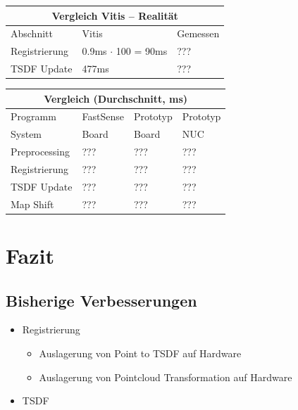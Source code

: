 \documentclass{beamer}
\begin{document}
\begin{frame}{\subsecname}
\centering
\begin{tabular}{ |l||l|l|  }
 \hline
 \multicolumn{3}{|c|}{Vergleich Vitis -- Realität} \\
 \hline
 Abschnitt      & Vitis & Gemessen\\
 \hline
 Registrierung  & 0.9ms $\cdot$ 100 = 90ms & ??? \\
 TSDF Update    & 477ms & ??? \\
 \hline
\end{tabular}
\end{frame}

\begin{frame}{\subsecname}
\centering
\begin{tabular}{ |p{3cm}||p{2cm}|p{2cm}|p{2cm}|  }
 \hline
 \multicolumn{4}{|c|}{Vergleich (Durchschnitt, ms)} \\
 \hline
 Programm       & FastSense & Prototyp & Prototyp \\
 \hline
 System         &     Board &    Board &      NUC \\
 \hline
 Preprocessing  &       ??? &      ??? &      ??? \\
 Registrierung  &       ??? &      ??? &      ??? \\
 TSDF Update    &       ??? &      ??? &      ??? \\
 Map Shift      &       ??? &      ??? &      ??? \\
\hline
\end{tabular}
\end{frame}



\section{Fazit}
\begin{frame}{}
\begin{center}
\end{center}
\end{frame}

\subsection{Bisherige Verbesserungen}
\begin{frame}{\subsecname}
\begin{itemize}
\item{Registrierung}
\begin{itemize}
\item{Auslagerung von Point to TSDF auf Hardware}
\item{Auslagerung von Pointcloud Transformation auf Hardware}
\end{itemize}
\item{TSDF}
\end{itemize}
\end{frame}
\end{document}
